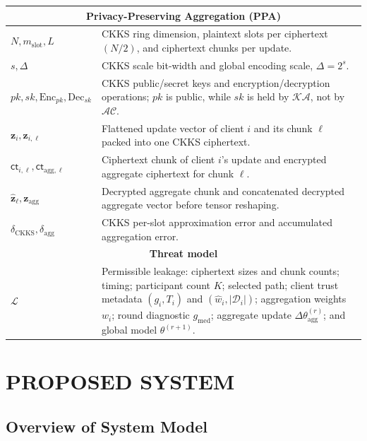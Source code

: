 \documentclass[journal]{IEEEtran}
\begin{document}
\begin{table}[H]
\begin{tabular}{|p{}|p{}|}
  \multicolumn{2}{|c|}{\textbf{Privacy-Preserving Aggregation (PPA)}} \\
  \hline
  $N,m_{\mathrm{slot}},L$ &
  CKKS ring dimension, plaintext slots per ciphertext $(N/2)$, and ciphertext chunks per update. \\
  \hline
  $s,\Delta$ &
  CKKS scale bit-width and global encoding scale, $\Delta=2^s$. \\
  \hline
  $pk,sk,\mathrm{Enc}_{pk},\mathrm{Dec}_{sk}$ &
  CKKS public/secret keys and encryption/decryption operations; $pk$ is public,
  while $sk$ is held by $\mathcal{KA}$, not by $\mathcal{AC}$. \\
  \hline
  $\mathbf{z}_i,\mathbf{z}_{i,\ell}$ &
  Flattened update vector of client $i$ and its chunk $\ell$ packed into one CKKS ciphertext. \\
  \hline
  $\mathsf{ct}_{i,\ell},\mathsf{ct}_{\mathrm{agg},\ell}$ &
  Ciphertext chunk of client $i$'s update and encrypted aggregate ciphertext for chunk $\ell$. \\
  \hline
  $\hat{\mathbf{z}}_\ell,\mathbf{z}_{\mathrm{agg}}$ &
  Decrypted aggregate chunk and concatenated decrypted aggregate vector before tensor reshaping. \\
  \hline
  $\delta_{\mathrm{CKKS}},\delta_{\mathrm{agg}}$ &
  CKKS per-slot approximation error and accumulated aggregation error. \\
  \hline

  \multicolumn{2}{|c|}{\textbf{Threat model}} \\
  \hline
  $\mathcal{L}$ &
  Permissible leakage: ciphertext sizes and chunk counts; timing;
  participant count $K$; selected path; client trust
  metadata $(g_i,T_i)$ and $(\hat{w}_i,|\mathcal{D}_i|)$;
  aggregation weights $w_i$; round diagnostic $g_{\mathrm{med}}$;
  aggregate update $\Delta\theta_{\mathrm{agg}}^{(r)}$; and global model
  $\theta^{(r+1)}$. \\
  \hline
  \end{tabular}
\end{table}

\section{PROPOSED SYSTEM}\label{sec:proposed_system}

\subsection{Overview of System Model}
\end{document}
